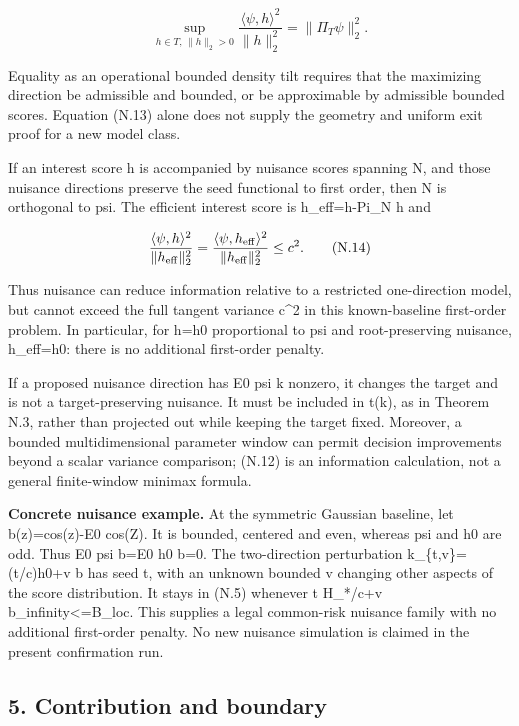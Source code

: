 \[
\sup_{h\in T,\,\|h\|_2>0}
\frac{\langle\psi,h\rangle^2}{\|h\|_2^2}
=\|\Pi_T\psi\|_2^2.
\tag{N.13}
\]

Equality as an operational bounded density tilt requires that the
maximizing direction be admissible and bounded, or be approximable by
admissible bounded scores. Equation (N.13) alone does not supply the
geometry and uniform exit proof for a new model class.

If an interest score h is accompanied by nuisance scores spanning N, and
those nuisance directions preserve the seed functional to first order,
then N is orthogonal to psi. The efficient interest score is
h\_eff=h-Pi\_N h and

\[
\frac{\langle\psi,h\rangle^2}{\|h_{\rm eff}\|_2^2}
=\frac{\langle\psi,h_{\rm eff}\rangle^2}{\|h_{\rm eff}\|_2^2}
\le c^2.
\tag{N.14}
\]

Thus nuisance can reduce information relative to a restricted
one-direction model, but cannot exceed the full tangent variance c\^{}2
in this known-baseline first-order problem. In particular, for h=h0
proportional to psi and root-preserving nuisance, h\_eff=h0: there is no
additional first-order penalty.

If a proposed nuisance direction has E0 psi k nonzero, it changes the
target and is not a target-preserving nuisance. It must be included in
t(k), as in Theorem N.3, rather than projected out while keeping the
target fixed. Moreover, a bounded multidimensional parameter window can
permit decision improvements beyond a scalar variance comparison; (N.12)
is an information calculation, not a general finite-window minimax
formula.

\textbf{Concrete nuisance example.} At the symmetric Gaussian baseline,
let b(z)=cos(z)-E0 cos(Z). It is bounded, centered and even, whereas psi
and h0 are odd. Thus E0 psi b=E0 h0 b=0. The two-direction perturbation
k\_\{t,v\}=(t/c)h0+v b has seed t, with an unknown bounded v changing
other aspects of the score distribution. It stays in (N.5) whenever
\textbar t\textbar{} H\_*/c+\textbar v\textbar{}
\textbar\textbar b\textbar\textbar\_infinity\textless=B\_loc. This
supplies a legal common-risk nuisance family with no additional
first-order penalty. No new nuisance simulation is claimed in the
present confirmation run.

\subsection{5. Contribution and
boundary}\label{contribution-and-boundary}

